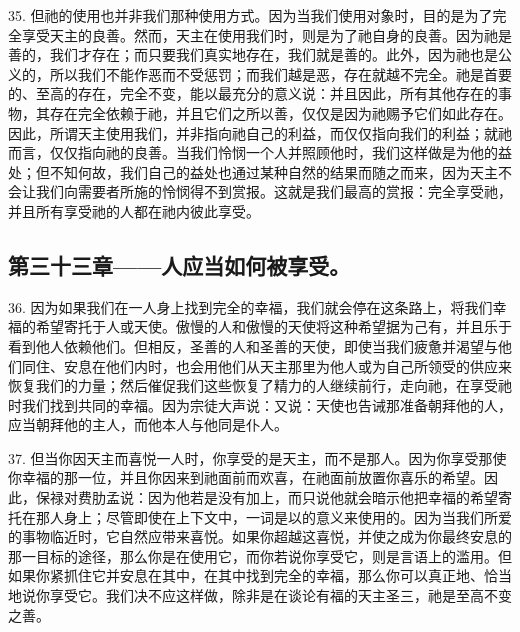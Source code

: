 35. 但祂的使用也并非我们那种使用方式。因为当我们使用对象时，目的是为了完全享受天主的良善。然而，天主在使用我们时，则是为了祂自身的良善。因为祂是善的，我们才存在；而只要我们真实地存在，我们就是善的。此外，因为祂也是公义的，所以我们不能作恶而不受惩罚；而我们越是恶，存在就越不完全。祂是首要的、至高的存在，完全不变，能以最充分的意义说：并且因此，所有其他存在的事物，其存在完全依赖于祂，并且它们之所以善，仅仅是因为祂赐予它们如此存在。因此，所谓天主使用我们，并非指向祂自己的利益，而仅仅指向我们的利益；就祂而言，仅仅指向祂的良善。当我们怜悯一个人并照顾他时，我们这样做是为他的益处；但不知何故，我们自己的益处也通过某种自然的结果而随之而来，因为天主不会让我们向需要者所施的怜悯得不到赏报。这就是我们最高的赏报：完全享受祂，并且所有享受祂的人都在祂内彼此享受。\par


\subsection{第三十三章——人应当如何被享受。}

36. 因为如果我们在一人身上找到完全的幸福，我们就会停在这条路上，将我们幸福的希望寄托于人或天使。傲慢的人和傲慢的天使将这种希望据为己有，并且乐于看到他人依赖他们。但相反，圣善的人和圣善的天使，即使当我们疲惫并渴望与他们同住、安息在他们内时，也会用他们从天主那里为他人或为自己所领受的供应来恢复我们的力量；然后催促我们这些恢复了精力的人继续前行，走向祂，在享受祂时我们找到共同的幸福。因为宗徒大声说：又说：天使也告诫那准备朝拜他的人，应当朝拜他的主人，而他本人与他同是仆人。\par

37. 但当你因天主而喜悦一人时，你享受的是天主，而不是那人。因为你享受那使你幸福的那一位，并且你因来到祂面前而欢喜，在祂面前放置你喜乐的希望。因此，保禄对费肋孟说：因为他若是没有加上，而只说他就会暗示他把幸福的希望寄托在那人身上；尽管即使在上下文中，一词是以的意义来使用的。因为当我们所爱的事物临近时，它自然应带来喜悦。如果你超越这喜悦，并使之成为你最终安息的那一目标的途径，那么你是在使用它，而你若说你享受它，则是言语上的滥用。但如果你紧抓住它并安息在其中，在其中找到完全的幸福，那么你可以真正地、恰当地说你享受它。我们决不应这样做，除非是在谈论有福的天主圣三，祂是至高不变之善。\par

